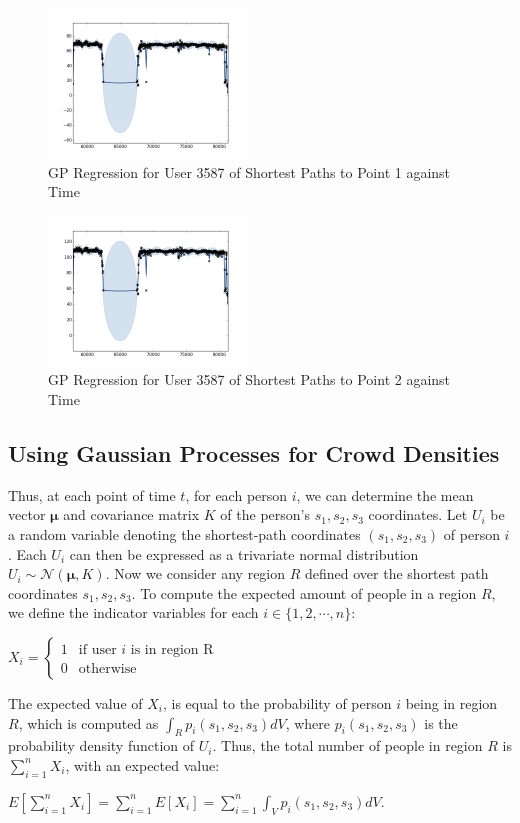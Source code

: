 \documentclass[letterpaper]{article}
\begin{document}
\begin{figure}[!h]
  \centering
    \includegraphics[width=200px]{diagrams/3587-path1.png}
  \caption{GP Regression for User 3587 of Shortest Paths to Point 1 against Time}
  \label{fig:path1}
\end{figure}

\begin{figure}[!h]
  \centering
    \includegraphics[width=200px]{diagrams/3587-path2.png}
  \caption{GP Regression for User 3587 of Shortest Paths to Point 2 against Time}
  \label{fig:path2}
\end{figure}


\subsection{Using Gaussian Processes for Crowd Densities}

Thus, at each point of time $t$, for each person $i$, we can determine the mean vector $\boldsymbol{\mu}$ and covariance matrix $K$ of the person's $s_1,s_2,s_3$ coordinates. Let $U_i$ be a random variable denoting the shortest-path coordinates $(s_1,s_2,s_3)$ of person $i$. Each $U_i$ can then be expressed as a trivariate normal distribution $U_i \sim \mathcal{N}(\boldsymbol{\mu},K)$. Now we consider any region $R$ defined over the shortest path coordinates $s_1,s_2,s_3$. To compute the expected amount of people in a region $R$, we define the indicator variables for each $i \in \{1,2,\cdots,n\}$:

\begin{center}
$X_i =
\begin{cases}
    1 &\text{if user }i\text{ is in region R}\\
    0 &\text{otherwise}
\end{cases}$
\end{center}
The expected value of $X_i$, is equal to the probability of person $i$ being in region $R$, which is computed as $\int_R p_i(s_1,s_2,s_3)dV$, where $p_i(s_1,s_2,s_3)$ is the probability density function of $U_i$. Thus, the total number of people in region $R$ is $\sum_{i=1}^n X_i$, with an expected value:
\begin{center}
$\displaystyle E[\sum_{i=1}^n X_i] = \sum_{i=1}^n E[X_i] = \sum_{i=1}^n \int_V p_i(s_1,s_2,s_3)dV$.
\end{center}
\end{document}
